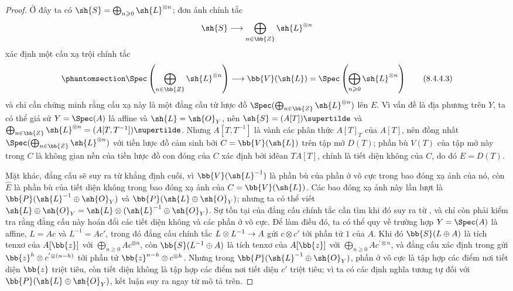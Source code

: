 \documentclass[oneside,10pt]{amsart}
\makeatletter
\renewcommand{\geq}{\geqslant}
\newcommand{\ega@arrow}[2]{\mathchoice{#1}{#2}{#2}{#2}}
\renewcommand{\to}{\ega@arrow{\longrightarrow}{\rightarrow}}
\newcommand{\oldpage}[2][]{\marginnote{\normalfont\footnotesize\textbf{#1}~|~#2}\ignorespaces}
\let\EGAOriginalLabel\label
\renewcommand{\label}[1]{\phantomsection\EGAOriginalLabel{#1}}
\newcommand*{\ega@labelnumber}[1]{\StrBehind{#1}{.}}
\newcommand{\eref}[1]{\hyperref[#1]{\normalfont{(\ega@labelnumber{#1})}}}
\makeatother
\begin{document}
\begin{proof}
Ở đây ta có $\sh{S}=\bigoplus_{n\geq0}\sh{L}^{\otimes n}$;
đơn ánh chính tắc
\[
  \sh{S} \to \bigoplus_{n\in\bb{Z}} \sh{L}^{\otimes n}
\]
xác định một cấu xạ trội chính tắc
\[
\label{eq:2.8.4.4.3}
  \Spec\left(
    \bigoplus_{n\in\bb{Z}} \sh{L}^{\otimes n}
  \right)
  \to
  \bb{V}(\sh{L})
  =
  \Spec\left(
    \bigoplus_{n\geq0} \sh{L}^{\otimes n}
  \right)
\tag{8.4.4.3}
\]
và chỉ cần chứng minh rằng cấu xạ này là một đẳng cấu từ lược đồ $\Spec(\bigoplus_{n\in\bb{Z}} \sh{L}^{\otimes n})$ lên $E$.
Vì vấn đề là địa phương trên $Y$, ta có thể giả sử $Y=\Spec(A)$ là affine
\oldpage[II]{169}
và $\sh{L}=\sh{O}_Y$, nên $\sh{S}=(A[T])\supertilde$ và $\bigoplus_{n\in\bb{Z}}\sh{L}^{\otimes n} = (A[T,T^{-1}])\supertilde$.
Nhưng $A[T,T^{-1}]$ là vành các phân thức $A[T]_T$ của $A[T]$, nên \eref{eq:2.8.4.4.3} đồng nhất $\Spec(\bigoplus_{n\in\bb{Z}}\sh{L}^{\otimes n})$ với tiền lược đồ cảm sinh bởi $C=\bb{V}(\sh{L})$ trên tập mở $D(T)$;
phần bù $V(T)$ của tập mở này trong $C$ là không gian nền của tiền lược đồ con đóng của $C$ xác định bởi iđêan $TA[T]$, chính là tiết diện không của $C$, do đó $E=D(T)$.

Mặt khác, đẳng cấu \eref{eq:2.8.4.4.2} sẽ suy ra từ khẳng định cuối, vì $\bb{V}(\sh{L}^{-1})$ là phần bù của phần ở vô cực trong bao đóng xạ ảnh của nó, còn $\widehat{E}$ là phần bù của tiết diện không trong bao đóng xạ ảnh của $C=\bb{V}(\sh{L})$.
Các bao đóng xạ ảnh này lần lượt là $\bb{P}(\sh{L}^{-1}\oplus\sh{O}_Y)$ và $\bb{P}(\sh{L}\oplus\sh{O}_Y)$;
nhưng ta có thể viết $\sh{L}\oplus\sh{O}_Y = \sh{L}\otimes(\sh{L}^{-1}\oplus\sh{O}_Y)$.
Sự tồn tại của đẳng cấu chính tắc cần tìm khi đó suy ra từ , và chỉ còn phải kiểm tra rằng đẳng cấu này hoán đổi các tiết diện không và các phần ở vô cực.
Để làm điều đó, ta có thể quy về trường hợp $Y=\Spec(A)$ là affine, $L=Ac$ và $L^{-1}=Ac'$, trong đó đẳng cấu chính tắc $L\otimes L^{-1}\to A$ gửi $c\otimes c'$ tới phần tử $1$ của $A$.
Khi đó $\bb{S}(L\oplus A)$ là tích tenxơ của $A[\bb{z}]$ với $\bigoplus_{n\geq0}Ac^{\otimes n}$, còn $\bb{S}(L^{-1}\oplus A)$ là tích tenxơ của $A[\bb{z}]$ với $\bigoplus_{n\geq0}Ac^{'\otimes n}$, và đẳng cấu xác định trong  gửi $\bb{z}^h\otimes c^{'\otimes(n-h)}$ tới phần tử $\bb{z}^{n-h}\otimes c^{\otimes h}$.
Nhưng trong $\bb{P}(\sh{L}^{-1}\oplus\sh{O}_Y)$, phần ở vô cực là tập hợp các điểm nơi tiết diện $\bb{z}$ triệt tiêu, còn tiết diện không là tập hợp các điểm nơi tiết diện $c'$ triệt tiêu;
vì ta có các định nghĩa tương tự đối với $\bb{P}(\sh{L}\oplus\sh{O}_Y)$, kết luận suy ra ngay từ mô tả trên.
\end{proof}
\end{document}
